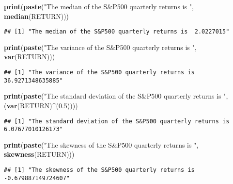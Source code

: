 \documentclass[]{article}
\newenvironment{Shaded}{\begin{snugshade}}{\end{snugshade}}
\newcommand{\KeywordTok}[1]{\textcolor[rgb]{0.13,0.29,0.53}{\textbf{#1}}}
\newcommand{\FloatTok}[1]{\textcolor[rgb]{0.00,0.00,0.81}{#1}}
\newcommand{\StringTok}[1]{\textcolor[rgb]{0.31,0.60,0.02}{#1}}
\newcommand{\OperatorTok}[1]{\textcolor[rgb]{0.81,0.36,0.00}{\textbf{#1}}}
\newcommand{\NormalTok}[1]{#1}
\begin{document}
\begin{Shaded}
\begin{Highlighting}[]
\KeywordTok{print}\NormalTok{(}\KeywordTok{paste}\NormalTok{(}\StringTok{"The median of the S&P500 quarterly returns is "}\NormalTok{, }\KeywordTok{median}\NormalTok{(RETURN)))}
\end{Highlighting}
\end{Shaded}

\begin{verbatim}
## [1] "The median of the S&P500 quarterly returns is  2.0227015"
\end{verbatim}

\begin{Shaded}
\begin{Highlighting}[]
\KeywordTok{print}\NormalTok{(}\KeywordTok{paste}\NormalTok{(}\StringTok{"The variance of the S&P500 quarterly returns is "}\NormalTok{, }\KeywordTok{var}\NormalTok{(RETURN)))}
\end{Highlighting}
\end{Shaded}

\begin{verbatim}
## [1] "The variance of the S&P500 quarterly returns is  36.9271348635885"
\end{verbatim}

\begin{Shaded}
\begin{Highlighting}[]
\KeywordTok{print}\NormalTok{(}\KeywordTok{paste}\NormalTok{(}\StringTok{"The standard deviation of the S&P500 quarterly returns is "}\NormalTok{, (}\KeywordTok{var}\NormalTok{(RETURN)}\OperatorTok{^}\NormalTok{(}\FloatTok{0.5}\NormalTok{))))}
\end{Highlighting}
\end{Shaded}

\begin{verbatim}
## [1] "The standard deviation of the S&P500 quarterly returns is  6.07677010126173"
\end{verbatim}

\begin{Shaded}
\begin{Highlighting}[]
\KeywordTok{print}\NormalTok{(}\KeywordTok{paste}\NormalTok{(}\StringTok{"The skewness of the S&P500 quarterly returns is "}\NormalTok{, }\KeywordTok{skewness}\NormalTok{(RETURN)))}
\end{Highlighting}
\end{Shaded}

\begin{verbatim}
## [1] "The skewness of the S&P500 quarterly returns is  -0.679887149724607"
\end{verbatim}
\end{document}
